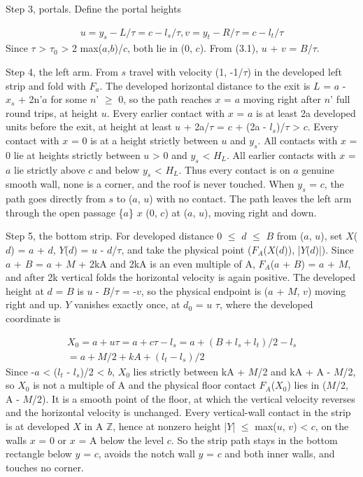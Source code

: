 \documentclass[11pt]{article}
\begin{document}
Step 3, portals. Define the portal heights

\begin{gather*}
u = y_{s} - L/\tau = c - l_{s}/\tau,   v = y_{t} - R/\tau = c - l_{t}/\tau
\end{gather*}
Since \(\tau\) > \(\tau_{0}\) > 2 max(\(a\),\(b\))/\(c\), both lie in (0, \(c\)). From (3.1), \(u\) + \(v\) = \(B\)/\(\tau\).

Step 4, the left arm. From \(s\) travel with velocity (1, -1/\(\tau\)) in the developed left strip and fold with \(F_{a}\). The developed horizontal distance to the exit is \(L\) = \(a\) - \(x_{s}\) + 2n'\(a\) for some \(n\)' \(\ge\) 0, so the path reaches \(x\) = \(a\) moving right after \(n\)' full round trips, at height \(u\). Every earlier contact with \(x\) = \(a\) is at least 2a developed units before the exit, at height at least \(u\) + 2a/\(\tau\) = \(c\) + (2a - \(l_{s}\))/\(\tau\) > \(c\). Every contact with \(x\) = 0 is at a height strictly between \(u\) and \(y_{s}\). All contacts with \(x\) = 0 lie at heights strictly between \(u\) > 0 and \(y_{s}\) < \(H_{L}\). All earlier contacts with \(x\) = \(a\) lie strictly above \(c\) and below \(y_{s}\) < \(H_{L}\). Thus every contact is on \(a\) genuine smooth wall, none is a corner, and the roof is never touched. When \(y_{s}\) = \(c\), the path goes directly from \(s\) to (\(a\), \(u\)) with no contact. The path leaves the left arm through the open passage \{\(a\)\} \(x\) (0, \(c\)) at (\(a\), \(u\)), moving right and down.

Step 5, the bottom strip. For developed distance 0 \(\le\) \(d\) \(\le\) \(B\) from (\(a\), \(u\)), set \(X\)(\(d\)) = \(a\) + \(d\), \(Y\)(\(d\)) = \(u\) - \(d\)/\(\tau\), and take the physical point (\(F_{A}\)(\(X\)(\(d\))), |\(Y\)(\(d\))|). Since \(a\) + \(B\) = \(a\) + \(M\) + 2kA and 2kA is an even multiple of A, \(F_{A}\)(\(a\) + \(B\)) = \(a\) + \(M\), and after 2k vertical folds the horizontal velocity is again positive. The developed height at \(d\) = \(B\) is \(u\) - \(B\)/\(\tau\) = -\(v\), so the physical endpoint is (\(a\) + \(M\), \(v\)) moving right and up. \(Y\) vanishes exactly once, at \(d_{0}\) = \(u\) \(\tau\), where the developed coordinate is

\begin{gather*}
X_{0} = a + u \tau = a + c \tau - l_{s} = a + (B + l_{s} + l_{t})/2 - l_{s} \\
= a + M/2 + kA + (l_{t} - l_{s})/2
\end{gather*}
Since -\(a\) < (\(l_{t}\) - \(l_{s}\))/2 < \(b\), \(X_{0}\) lies strictly between kA + \(M\)/2 and kA + A - \(M\)/2, so \(X_{0}\) is not a multiple of A and the physical floor contact \(F_{A}\)(\(X_{0}\)) lies in (\(M\)/2, A - \(M\)/2). It is a smooth point of the floor, at which the vertical velocity reverses and the horizontal velocity is unchanged. Every vertical-wall contact in the strip is at developed \(X\) in A \(\mathbb{Z}\), hence at nonzero height |\(Y\)| \(\le\) max(\(u\), \(v\)) < \(c\), on the walls \(x\) = 0 or \(x\) = A below the level \(c\). So the strip path stays in the bottom rectangle below \(y\) = \(c\), avoids the notch wall \(y\) = \(c\) and both inner walls, and touches no corner.
\end{document}

